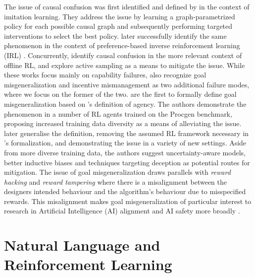 \documentclass[../main.tex]{subfiles}
\begin{document}
The issue of causal confusion was first identified and defined by \citet{de_haan_causal_2019} in the
context of imitation learning. They address the issue by learning a graph-parametrized policy for
each possible causal graph and subsequently performing targeted interventions to select the best
policy.  later successfully identify the same phenomenon in the context of
preference-based \citep{christiano_deep_2017} inverse reinforcement learning (IRL)
\citep{ng_algorithms_2000}. Concurrently, \citet{gupta_can_2022} identify causal confusion in the
more relevant context of offline RL, and explore active sampling as a means to mitigate the issue.
While these works focus mainly on capability failures, \citet{kirk_causal_2022} also recognize goal
misgeneralization and incentive mismanagement \citep{farquhar_path-specific_2022} as two additional
failure modes, where we focus on the former of the two.  are the first to
formally define goal misgeneralization based on \citet{orseau_agents_2018}'s definition of agency.
The authors demonstrate the phenomenon in a number of RL agents trained on the Procgen
\citep{cobbe_leveraging_2020} benchmark, proposing increased training data diversity as a means of
alleviating the issue.  later generalise the definition, removing the assumed
RL framework necessary in \citet{langosco_goal_2022}'s formalization, and demonstrating the issue in
a variety of new settings. Aside from more diverse training data, the authors suggest
uncertainty-aware models, better inductive biases and techniques targeting deception as potential
routes for mitigation. The issue of goal misgeneralization draws parallels with \textit{reward
hacking} \citep{pan_effects_2022, skalse_defining_2022} and \textit{reward tampering}
\citep{everitt_reward_2021} where there is a misalignment between the designers intended behaviour
and the algorithm's behaviour due to misspecified rewards. This misalignment makes goal
misgeneralization of particular interest to research in Artificial Intelligence (AI) alignment
\citep{ngo_alignment_2022} and AI safety more broadly \citep{hendrycks_unsolved_2022,
houben_inspect_2022}.

\section{Natural Language and Reinforcement Learning} 
\end{document}
